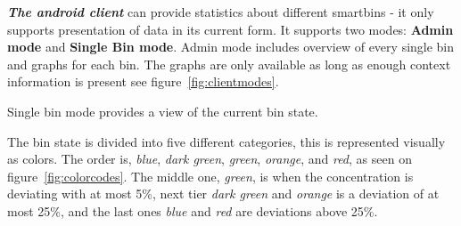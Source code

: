 \textit{\textbf{The android client}} can provide statistics about different smartbins - it only supports  presentation of data in its current form.
It supports two modes: \textbf{Admin mode} and \textbf{Single Bin mode}.
Admin mode includes overview of every single bin and graphs for each bin. The graphs are only available as long as enough context information is present see figure~\ref{fig:clientmodes}.

 Single bin mode provides a view of the current bin state.
 
 The bin state is divided into five different categories, this is represented visually as colors.
 The order is, \textit{blue}, \textit{dark green}, \textit{green}, \textit{orange}, and \textit{red}, as seen on figure~\ref{fig:colorcodes}.
The middle one, \textit{green}, is when the concentration is deviating with at most 5\%, next tier \textit{dark green} and \textit{orange} is a deviation of at most 25\%, and the last ones \textit{blue} and \textit{red} are deviations above 25\%.

